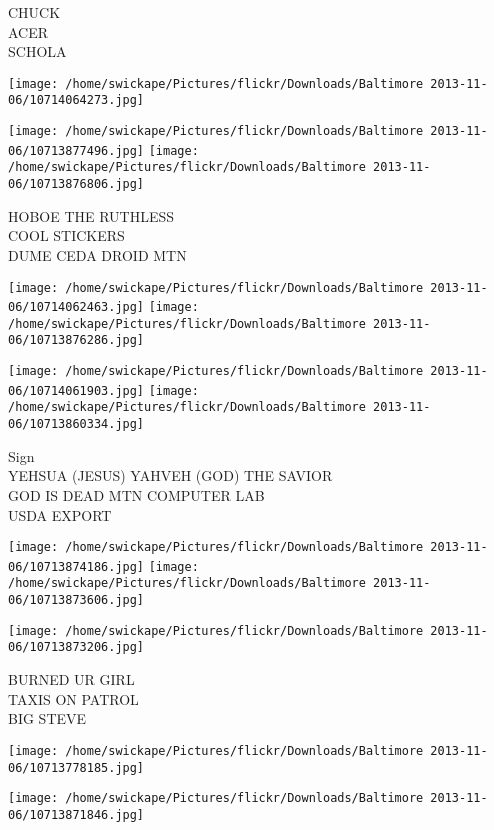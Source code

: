 \documentclass[10pt,letterpaper]{article}
\begin{document}
CHUCK\\
ACER\\
SCHOLA\\
\pagebreak

\texttt{[image: /home/swickape/Pictures/flickr/Downloads/Baltimore 2013-11-06/10714064273.jpg]}

\vspace{0.25in}
\texttt{[image: /home/swickape/Pictures/flickr/Downloads/Baltimore 2013-11-06/10713877496.jpg]}
\texttt{[image: /home/swickape/Pictures/flickr/Downloads/Baltimore 2013-11-06/10713876806.jpg]}

HOBOE THE RUTHLESS\\
COOL STICKERS\\
DUME CEDA DROID MTN\\
\pagebreak

\texttt{[image: /home/swickape/Pictures/flickr/Downloads/Baltimore 2013-11-06/10714062463.jpg]}
\texttt{[image: /home/swickape/Pictures/flickr/Downloads/Baltimore 2013-11-06/10713876286.jpg]}

\texttt{[image: /home/swickape/Pictures/flickr/Downloads/Baltimore 2013-11-06/10714061903.jpg]}
\texttt{[image: /home/swickape/Pictures/flickr/Downloads/Baltimore 2013-11-06/10713860334.jpg]}

Sign\\
YEHSUA (JESUS) YAHVEH (GOD) THE SAVIOR\\
GOD IS DEAD MTN COMPUTER LAB\\
USDA EXPORT\\
\pagebreak

\texttt{[image: /home/swickape/Pictures/flickr/Downloads/Baltimore 2013-11-06/10713874186.jpg]}
\texttt{[image: /home/swickape/Pictures/flickr/Downloads/Baltimore 2013-11-06/10713873606.jpg]}

\vspace{0.25in}
\texttt{[image: /home/swickape/Pictures/flickr/Downloads/Baltimore 2013-11-06/10713873206.jpg]}

BURNED UR GIRL\\
TAXIS ON PATROL\\
BIG STEVE\\
\pagebreak

\texttt{[image: /home/swickape/Pictures/flickr/Downloads/Baltimore 2013-11-06/10713778185.jpg]}

\vspace{0.25in}
\texttt{[image: /home/swickape/Pictures/flickr/Downloads/Baltimore 2013-11-06/10713871846.jpg]}
\end{document}
